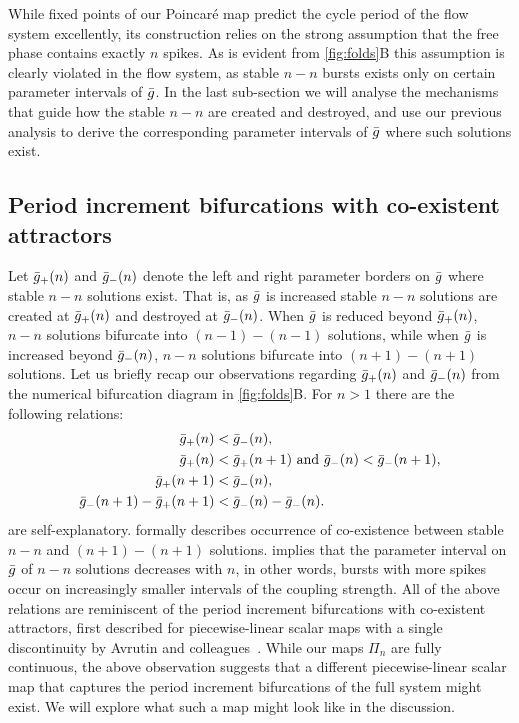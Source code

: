 \documentclass[../manuscript.tex]{subfiles}
\begin{document}
While fixed points of our Poincaré map predict the cycle period of the flow system excellently, its construction relies on the strong assumption that the free phase contains exactly $n$ spikes.
As is evident from \cref{fig:folds}B this assumption is clearly violated in the flow system, as stable $n-n$ bursts exists only on certain parameter intervals of $\bar g$.
In the last sub-section we will analyse the mechanisms that guide how the stable $n-n$ are created and destroyed, and use our previous analysis to derive the corresponding parameter intervals of $\bar g$ where such solutions exist.

\subsection{Period increment bifurcations with co-existent attractors}
Let $\bar g_+(n)$ and $\bar g_-(n)$ denote the left and right parameter borders on $\bar g$ where stable $n-n$ solutions exist.
That is, as $\bar g$ is increased stable $n-n$ solutions are created at $\bar g_+(n)$ and destroyed at $\bar g_-(n)$.
When $\bar g$ is reduced beyond $\bar g_+(n)$, $n-n$ solutions bifurcate into $(n-1)-(n-1)$ solutions, while when $\bar g$ is increased beyond $\bar g_-(n)$, $n-n$ solutions bifurcate into $(n+1)-(n+1)$ solutions.
Let us briefly recap our observations regarding $\bar g_+(n)$ and $\bar g_-(n)$ from the numerical bifurcation diagram in \cref{fig:folds}B.
For $n>1$ there are the following relations:
\begin{align}
  \bar g_+(n)                  & < \bar g_-(n)\label{eq:easy1},                                       \\
  \bar g_+(n)                  & < \bar g_+(n+1)\text{ and } \bar g_-(n)<\bar g_-(n+1)\label{eq:easy2}, \\
  \bar g_+(n+1)                & < \bar g_-(n)\label{eq:coexistence},                                 \\
  \bar g_-(n+1) - \bar g_+(n+1) & < \bar g_-(n) - \bar g_-(n)\label{eq:robustness}.
\end{align}
 are self-explanatory.
 formally describes occurrence of co-existence between stable $n-n$ and $(n+1)-(n+1)$ solutions.
 implies that the parameter interval on $\bar g$ of $n-n$ solutions decreases with $n$, in other words, bursts with more spikes occur on increasingly smaller intervals of the coupling strength.
All of the above relations are reminiscent of the period increment bifurcations with co-existent attractors, first described for piecewise-linear scalar maps with a single discontinuity by Avrutin and colleagues~\cite[e.g. see][]{gardini2012,tramontana2012,avrutin2011,gardini2012}.
While our maps $\Pi_n$ are fully continuous, the above observation suggests that
a different piecewise-linear scalar map that captures the period increment bifurcations of the full system might exist.
We will explore what such a map might look like in the discussion.
\end{document}
